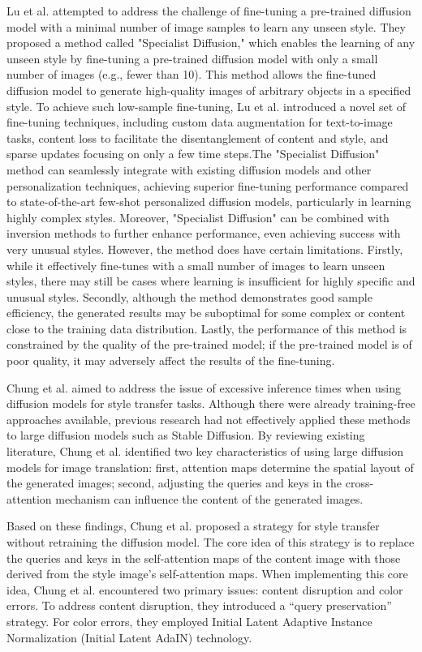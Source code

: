 Lu et al.\citep{65lu2023specialist} attempted to address the challenge of fine-tuning a pre-trained diffusion model with a minimal number of image samples to learn any unseen style. They proposed a method called "Specialist Diffusion," which enables the learning of any unseen style by fine-tuning a pre-trained diffusion model with only a small number of images (e.g., fewer than 10). This method allows the fine-tuned diffusion model to generate high-quality images of arbitrary objects in a specified style. To achieve such low-sample fine-tuning, Lu et al. introduced a novel set of fine-tuning techniques, including custom data augmentation for text-to-image tasks, content loss to facilitate the disentanglement of content and style, and sparse updates focusing on only a few time steps.The "Specialist Diffusion" method can seamlessly integrate with existing diffusion models and other personalization techniques, achieving superior fine-tuning performance compared to state-of-the-art few-shot personalized diffusion models, particularly in learning highly complex styles. Moreover, "Specialist Diffusion" can be combined with inversion methods to further enhance performance, even achieving success with very unusual styles. However, the method does have certain limitations. Firstly, while it effectively fine-tunes with a small number of images to learn unseen styles, there may still be cases where learning is insufficient for highly specific and unusual styles. Secondly, although the method demonstrates good sample efficiency, the generated results may be suboptimal for some complex or content close to the training data distribution. Lastly, the performance of this method is constrained by the quality of the pre-trained model; if the pre-trained model is of poor quality, it may adversely affect the results of the fine-tuning. 

Chung et al.\citep{66chung2024style} aimed to address the issue of excessive inference times when using diffusion models for style transfer tasks. Although there were already training-free approaches available, previous research had not effectively applied these methods to large diffusion models such as Stable Diffusion. By reviewing existing literature, Chung et al. identified two key characteristics of using large diffusion models for image translation: first, attention maps determine the spatial layout of the generated images; second, adjusting the queries and keys in the cross-attention mechanism can influence the content of the generated images.

Based on these findings, Chung et al. proposed a strategy for style transfer without retraining the diffusion model. The core idea of this strategy is to replace the queries and keys in the self-attention maps of the content image with those derived from the style image’s self-attention maps. When implementing this core idea, Chung et al. encountered two primary issues: content disruption and color errors. To address content disruption, they introduced a “query preservation” strategy. For color errors, they employed Initial Latent Adaptive Instance Normalization (Initial Latent AdaIN) technology.

